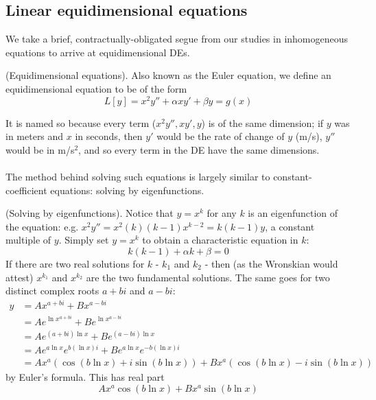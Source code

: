 \documentclass{article}
\begin{document}
\subsection{Linear equidimensional equations}
We take a brief, contractually-obligated segue from our studies in inhomogeneous equations to arrive at equidimensional DEs.
\begin{definition}
    (Equidimensional equations). Also known as the Euler equation, we define an equidimensional equation to be of the form
    \begin{equation*}
        L[y] = x^2y'' + \alpha xy' + \beta y = g(x)
    \end{equation*}
\end{definition}
It is named so because every term ($x^2y'', xy', y$) is of the same dimension; if $y$ was in meters and $x$ in seconds, then $y'$ would be the rate of change of $y$ (m/s), $y''$ would be in m/s$^2$, and so every term in the DE have the same dimensions.
\\ \\
The method behind solving such equations is largely similar to constant-coefficient equations: solving by eigenfunctions.
\begin{method}
(Solving by eigenfunctions). Notice that $y=x^k$ for any $k$ is an eigenfunction of the equation: e.g. $x^2y'' = x^2(k)(k-1)x^{k-2} = k(k-1)y$, a constant multiple of $y$. Simply set $y = x^k$ to obtain a characteristic equation in $k$:
 \begin{equation*}
    k(k-1) + \alpha k + \beta = 0
 \end{equation*}
 If there are two real solutions for $k$ - $k_1$ and $k_2$ - then (as the Wronskian would attest) $x^{k_1}$ and $x^{k_2}$ are the two fundamental solutions. The same goes for two distinct complex roots $a+bi$ and $a-bi$:
 \begin{equation*}
    \begin{aligned}
        y &= Ax^{a+bi} + Bx^{a-bi} \\
        &= Ae^{\ln x^{a+bi}} + Be^{\ln x^{a-bi}}  \\
        &= Ae^{(a+bi)\ln x} + Be^{(a-bi)\ln x} \\
        &= Ae^{a\ln x}e^{b(\ln x)i} + Be^{a\ln x}e^{-b(\ln x)i} \\
        &= Ax^a(\cos (b\ln x) + i\sin (b\ln x)) + Bx^a(\cos (b\ln x) - i\sin (b\ln x))
    \end{aligned}
 \end{equation*}
 by Euler's formula. This has real part
 \begin{equation*}
    Ax^a\cos (b\ln x) + Bx^a\sin (b \ln x)
 \end{equation*}
\end{method}
\end{document}
